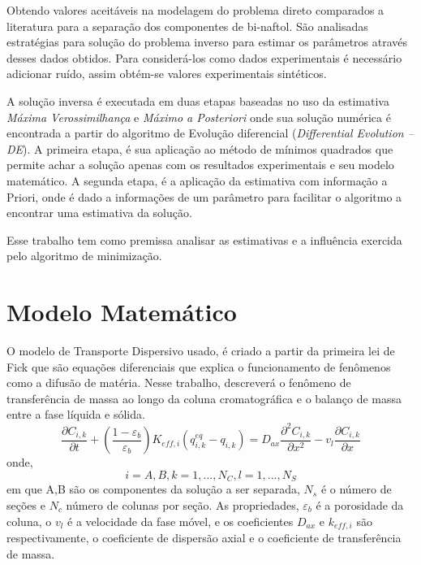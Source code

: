 \documentclass[por]{Template_SBEF}
\begin{document}
Obtendo valores aceitáveis na modelagem do problema direto comparados a literatura para a separação dos componentes de bi-naftol. São analisadas estratégias para solução do problema inverso para estimar os parâmetros através desses dados obtidos. Para considerá-los como dados experimentais é necessário adicionar ruído, assim obtém-se valores experimentais sintéticos.

A solução inversa é executada em duas etapas baseadas no uso da estimativa \textit{Máxima Verossimilhança} e \textit{Máximo a Posteriori} onde sua solução numérica é encontrada a partir do algoritmo de Evolução diferencial (\textit{Differential Evolution – DE}). A primeira etapa, é sua aplicação ao método de mínimos quadrados que permite achar a solução apenas com os resultados experimentais e seu modelo matemático. A segunda etapa, é a aplicação da estimativa com informação a Priori, onde é dado a informações de um parâmetro para facilitar o algoritmo a encontrar uma estimativa da solução.

Esse trabalho tem como premissa analisar as estimativas e a influência exercida pelo algoritmo de minimização.


\section{Modelo Matemático}
   O modelo de Transporte Dispersivo usado, é criado a partir da primeira lei de Fick que são equações diferenciais que explica o funcionamento de fenômenos como a difusão de matéria. Nesse trabalho, descreverá o fenômeno de transferência de massa ao longo da coluna cromatográfica e o balanço de massa entre a fase líquida e sólida.
\begin{equation}
\frac{\partial C_{i,k}}{\partial t} + (\frac{1-\varepsilon_b}{\varepsilon_b}
) K_{eff,i} (q_{i,k}^{eq} - q_{i,k}) = D_{ax} \frac{\partial^2 C_{i,k}}{\partial x^2} 
- v_l \frac{\partial C_{i,k}}{\partial x}
\end{equation}
onde, 
\begin{equation}
i = A,B, k = 1,...,N_C, l = 1,...,N_S 
\end{equation}
em que A,B são os componentes da solução a ser separada, $N_s$ é o número de seções e $N_c$ número de colunas por seção. As propriedades, $\varepsilon_b$ é a porosidade da coluna, o $v_l$ é a velocidade da fase móvel, e os coeficientes $D_{ax}$ e $k_{eff,i}$  são respectivamente, o coeficiente de dispersão axial e o coeficiente de transferência de massa\cite{claudir_tese}.
\end{document}
